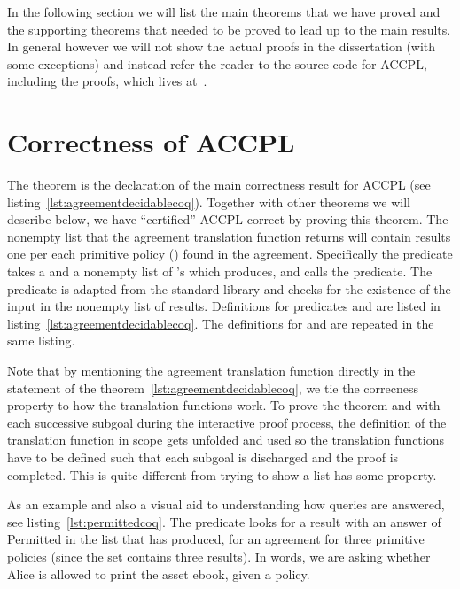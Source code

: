 In the following section we will list the main theorems that we have proved and the supporting theorems that needed to be proved to lead up to the main results. In general however we will not show the actual proofs in the dissertation (with some exceptions) and instead refer the reader to the source code for \ac{ACCPL}, including the proofs, which lives at~\cite{BahmanSistany2015}.

\section{Correctness of ACCPL}\label{sec:maintheorems}

The theorem  is the declaration of the main correctness result for \ac{ACCPL} (see listing~\ref{lst:agreementdecidablecoq}). Together with other theorems we will describe below, we have ``certified'' \ac{ACCPL} correct by proving this theorem. The nonempty list that the agreement translation function  returns will contain results one per each primitive policy () found in the agreement. Specifically the predicate  takes a  and a nonempty list of 's which  produces, and calls the  predicate. The  predicate is adapted from the  standard library and checks for the existence of the input  in the nonempty list of results. Definitions for predicates  and  are listed in listing~\ref{lst:agreementdecidablecoq}. The definitions for  and  are repeated in the same listing. 


Note that by mentioning the agreement translation function directly in the statement of the theorem~\ref{lst:agreementdecidablecoq}, we tie the correcness property to how the translation functions work. To prove the theorem and with each successive subgoal during the interactive proof process, the definition of the translation function in scope gets unfolded and used so the translation functions have to be defined such that each subgoal is discharged and the proof is completed. This is quite different from trying to show a list has some property. 


As an example and also a visual aid to understanding how queries are answered, see listing~\ref{lst:permittedcoq}. The  predicate looks for a result with an answer of Permitted in the list that  has produced, for an agreement for three primitive policies (since the set contains three results). In words, we are asking whether Alice is allowed to print the asset ebook, given a policy. 

